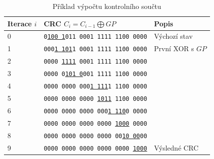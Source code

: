 \begin{table}[h]
    \centering
    \begin{tabular}{ | l | l | l | }
        \hline
        Iterace $i$ & \makecell{CRC\\$C_{i}=C_{i-1} \bigoplus GP$}  & Popis \\ \hline\hline
        0           & \texttt{0\underline{100 1}011 0001 1111 1100 0000}         & Výchozí stav \\ \hline
        1           & \texttt{000\underline{1 101}1 0001 1111 1100 0000}         & První XOR s $GP$ \\ \hline
        2           & \texttt{0000 \underline{1111} 0001 1111 1100 0000}         & \\ \hline
        3           & \texttt{0000 0\underline{101 0}001 1111 1100 0000}                & \\ \hline
        4           & \texttt{0000 0000 000\underline{1 111}1 1100 0000}                & \\ \hline
        5           & \texttt{0000 0000 0000 \underline{1011} 1100 0000}                & \\ \hline
        6           & \texttt{0000 0000 0000 000\underline{1 110}0 0000}                & \\ \hline
        7           & \texttt{0000 0000 0000 0000 \underline{1000} 0000}                & \\ \hline
        8           & \texttt{0000 0000 0000 0000 00\underline{10 00}00}                & \\ \hline
        9           & \texttt{0000 0000 0000 0000 0000 \underline{1000}}           & Výsledné CRC\\ \hline
    \end{tabular}
    \label{tab:crc-example}
    \caption{Příklad výpočtu kontrolního součtu}
\end{table}

